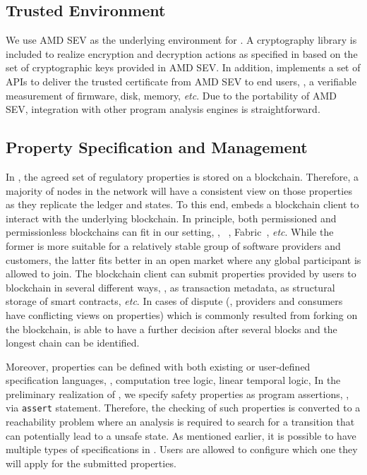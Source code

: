  

\subsection{Trusted Environment}
\label{subsec:env}

We use AMD SEV as the underlying \tee environment for \tool. A cryptography library is included to realize 
encryption and decryption actions as specified in \tcpa based on the set of cryptographic keys provided in AMD SEV. 
In addition, \tool implements a set of APIs to deliver the trusted certificate from AMD SEV to end users, \eg, a 
verifiable measurement of firmware, disk, memory, \textit{etc}. Due to the portability of AMD SEV, integration with other 
program analysis engines is straightforward.


\subsection{Property Specification and Management}
\label{subsec:property}
In \tool, the agreed set of regulatory properties is stored on a blockchain. Therefore, a majority of nodes 
in the network will have a consistent view on those properties as they replicate the ledger and states. To 
this end, \tool embeds a blockchain client to interact with the underlying blockchain. In principle, both 
permissioned and permissionless blockchains can fit in our setting, \eg, \ethereum~\cite{wood2014ethereum}, 
Fabric~\cite{cachin2016architecture}, \textit{etc}. While the former is more suitable for a relatively stable group of 
software providers and customers, the latter fits better in an open market where any global participant is 
allowed to join. The blockchain client can submit properties provided by users to blockchain in several different 
ways, \eg, as transaction metadata, as structural storage of smart contracts, \textit{etc}. In cases of dispute (\ie, 
providers and consumers have conflicting views on properties) which is commonly resulted from forking on the 
blockchain, \tool is able to have a further decision after several blocks and the longest chain can be identified. 

Moreover, properties can be defined with both existing or user-defined specification languages, \eg, computation 
tree logic, linear temporal logic, \etc In the preliminary realization of \tcpa, we specify safety properties as 
program assertions, \eg, via \texttt{assert} statement. Therefore, the checking of such properties is converted to 
a reachability problem where an analysis is required to search for a transition that can potentially lead to a 
unsafe state. As mentioned earlier, it is possible to have multiple types of specifications in \tool. Users are allowed to configure 
which one they will apply for the submitted properties. 


